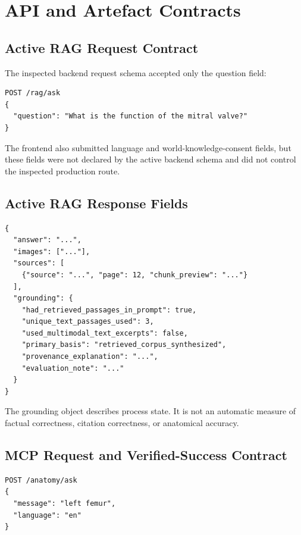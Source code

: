 \chapter{API and Artefact Contracts}
\label{app:api-examples}

\section{Active RAG Request Contract}
\label{app:rag-contract}

The inspected backend request schema accepted only the question field:
\begin{lstlisting}[language={},caption={RAG request supported by the inspected backend schema.}]
POST /rag/ask
{
  "question": "What is the function of the mitral valve?"
}
\end{lstlisting}

The frontend also submitted language and world-knowledge-consent fields, but these fields were not declared by the active backend schema and did not control the inspected production route.

\section{Active RAG Response Fields}
\label{app:rag-response-contract}

\begin{lstlisting}[language={},caption={Response-field structure declared by the inspected RAG schema.}]
{
  "answer": "...",
  "images": ["..."],
  "sources": [
    {"source": "...", "page": 12, "chunk_preview": "..."}
  ],
  "grounding": {
    "had_retrieved_passages_in_prompt": true,
    "unique_text_passages_used": 3,
    "used_multimodal_text_excerpts": false,
    "primary_basis": "retrieved_corpus_synthesized",
    "provenance_explanation": "...",
    "evaluation_note": "..."
  }
}
\end{lstlisting}

The grounding object describes process state. It is not an automatic measure of factual correctness, citation correctness, or anatomical accuracy.

\section{MCP Request and Verified-Success Contract}
\label{app:mcp-contract}

\begin{lstlisting}[language={},caption={MCP anatomy request.}]
POST /anatomy/ask
{
  "message": "left femur",
  "language": "en"
}
\end{lstlisting}

